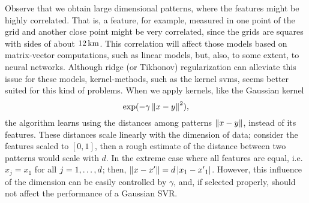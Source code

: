 %
Observe that we obtain large dimensional patterns, where the features might be highly correlated. That is, a feature,  for example, measured in one point of the grid and another close point might be very correlated, since the grids are squares with sides of about $\SI{12}{\kilo\metre}$.
This correlation will affect those models based on matrix-vector computations, such as linear models, but, also, to some extent, to neural networks.
Although ridge (or Tikhonov) regularization can alleviate this issue for these models, kernel-methods, such as the kernel \acrshort{svm}s, seems better suited for this kind of problems.
When we apply kernels, like the Gaussian kernel $$\exp({-\gamma \left\lVert x-y\right\rVert^2}),$$ the algorithm learns using the distances among patterns $\left\lVert x - y\right\rVert$, instead of its features.
%
These distances scale linearly with the dimension of data; consider the features scaled to $[0, 1]$, then a rough estimate of the distance between two patterns would scale with $d$. In the extreme case where all features are equal, i.e. $x_j = x_1$ for all $j=1, \ldots, d$; then, $\left\lVert x - x'\right\rVert = d \left|x_1 - {x'}_1\right| $.
However, this influence of the dimension can be easily controlled by $\gamma$, and, if selected properly, should not affect the performance of a Gaussian SVR.


